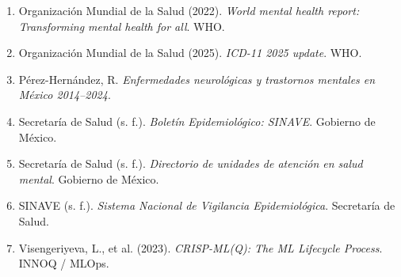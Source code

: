 \documentclass[12pt,letterpaper]{article}
\begin{document}
\begin{small}
\begin{enumerate}[leftmargin=*]
    \item Organización Mundial de la Salud (2022). \textit{World mental health report: Transforming mental health for all}. WHO.
    \item Organización Mundial de la Salud (2025). \textit{ICD-11 2025 update}. WHO.
    \item Pérez-Hernández, R. \textit{Enfermedades neurológicas y trastornos mentales en México 2014--2024}.
    \item Secretaría de Salud (s. f.). \textit{Boletín Epidemiológico: SINAVE}. Gobierno de México.
    \item Secretaría de Salud (s. f.). \textit{Directorio de unidades de atención en salud mental}. Gobierno de México.
    \item SINAVE (s. f.). \textit{Sistema Nacional de Vigilancia Epidemiológica}. Secretaría de Salud.
    \item Visengeriyeva, L., et al. (2023). \textit{CRISP-ML(Q): The ML Lifecycle Process}. INNOQ / MLOps.
\end{enumerate}
\end{small}
\end{document}

